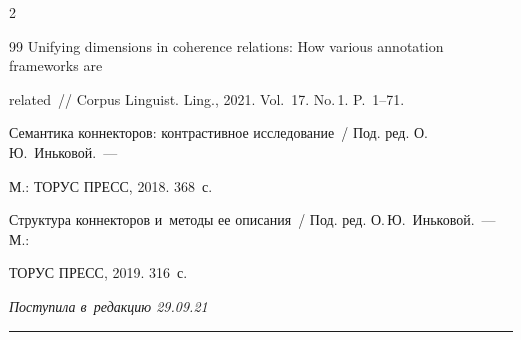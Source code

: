 \begin{multicols}{2}
{{\begin{thebibliography}{99}
Unifying dimensions in coherence relations: How various annotation frameworks are 


related~// Corpus Linguist. Ling., 2021. Vol.~17. No.\,1. P.~1--71.




Семантика коннекторов: контрастивное исследование~/ Под. ред. О.\,Ю.~Иньковой.~--- 


М.: ТОРУС ПРЕСС, 2018. 368~с.




Структура коннекторов и~методы ее описания~/ Под. ред. О.\,Ю.~Иньковой.~--- М.: 


ТОРУС ПРЕСС, 2019. 316~с.





\end{thebibliography}





 }


 }





\end{multicols}





\vspace*{-6pt}





\hfill{\small\textit{Поступила в~редакцию 29.09.21}}





\vspace*{8pt}




















\hrule





\vspace*{2pt}





